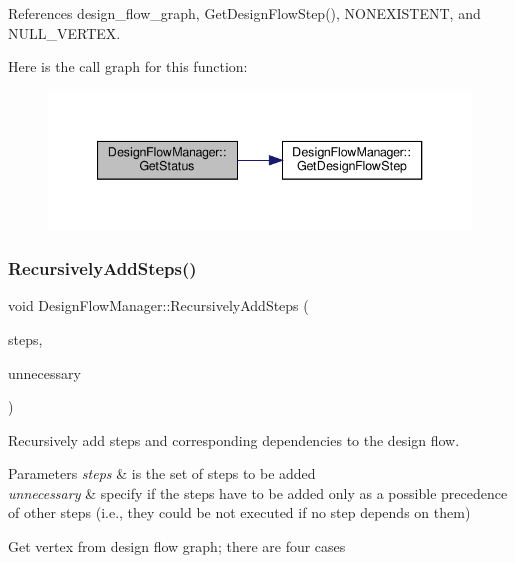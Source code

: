 References design\+\_\+flow\+\_\+graph, Get\+Design\+Flow\+Step(), N\+O\+N\+E\+X\+I\+S\+T\+E\+NT, and N\+U\+L\+L\+\_\+\+V\+E\+R\+T\+EX.

Here is the call graph for this function\+:
\nopagebreak
\begin{figure}[H]
\begin{center}
\leavevmode
\includegraphics[width=340pt]{de/d63/classDesignFlowManager_af692644b14a5f889d8511f41aa1317b4_cgraph}
\end{center}
\end{figure}
\mbox{\label{classDesignFlowManager_ab5d3fe2338fef7db3edacd11d8539da0}} 
\subsubsection{\texorpdfstring{Recursively\+Add\+Steps()}{RecursivelyAddSteps()}}
{\footnotesize\ttfamily void Design\+Flow\+Manager\+::\+Recursively\+Add\+Steps (\begin{DoxyParamCaption}\item[{const \hyperlink{classDesignFlowStepSet}{Design\+Flow\+Step\+Set} \&}]{steps,  }\item[{const bool}]{unnecessary }\end{DoxyParamCaption})\hspace{0.3cm}{\ttfamily [private]}}



Recursively add steps and corresponding dependencies to the design flow. 


\begin{DoxyParams}{Parameters}
{\em steps} & is the set of steps to be added \\
\hline
{\em unnecessary} & specify if the steps have to be added only as a possible precedence of other steps (i.\+e., they could be not executed if no step depends on them) \\
\hline
\end{DoxyParams}
Get vertex from design flow graph; there are four cases

